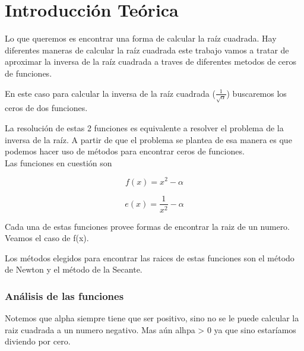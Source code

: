 \documentclass[10pt,a4paper]{article} \usepackage[utf8]{inputenc} %
\begin{document}
\newpage \section{Introducción Teórica}

Lo que queremos es encontrar una forma de calcular la raíz cuadrada. Hay
diferentes maneras de calcular la raíz cuadrada%
este trabajo vamos a tratar de aproximar la inversa de la raíz cuadrada a
traves de diferentes metodos de ceros de funciones.

En este caso para calcular la inversa de la raíz cuadrada
($\displaystyle\frac{1}{\sqrt{\alpha}}$) buscaremos los ceros de dos funciones.

La resolución de estas 2 funciones es equivalente a resolver el problema de la
inversa de la raíz. A partir de que el problema se plantea de esa manera es que
podemos hacer uso de métodos para encontrar ceros de funciones.\\

Las funciones en cuestión son

\begin{displaymath} f(x) = x^2 - \alpha \end{displaymath}

\begin{displaymath} e(x) = \frac{1}{x^2} - \alpha \end{displaymath}

Cada una de estas funciones provee formas de encontrar la raiz de un numero.
Veamos el caso de f(x).

Los métodos elegidos para encontrar las raices de estas funciones son el método
de Newton y el método de la Secante.

\subsubsection{Análisis de las funciones}

Notemos que alpha siempre tiene que ser positivo, sino no se le puede calcular la raiz cuadrada a un numero negativo. Mas aún alhpa > 0 ya que sino estaríamos diviendo por cero.
\end{document}
